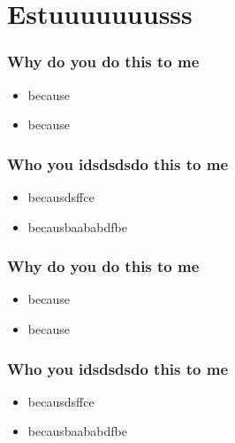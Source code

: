 \documentclass{beamer}
\begin{document}
    \section{Estuuuuuuusss}
        \begin{frame}
            \frametitle{Why do you do this to me}
            \begin{itemize}
                \item because
                \item because
            \end{itemize}
        \end{frame}
        \begin{frame}
            \frametitle{Who you idsdsdsdo this to me}
            \begin{itemize}
                \item becausdsffce
                \item becausbaababdfbe
            \end{itemize}
        \end{frame}
        \begin{frame}
            \frametitle{Why do you do this to me}
            \begin{itemize}
                \item because
                \item because
            \end{itemize}
        \end{frame}
        \begin{frame}
            \frametitle{Who you idsdsdsdo this to me}
            \begin{itemize}
                \item becausdsffce
                \item becausbaababdfbe
            \end{itemize}
        \end{frame}
\end{document}
